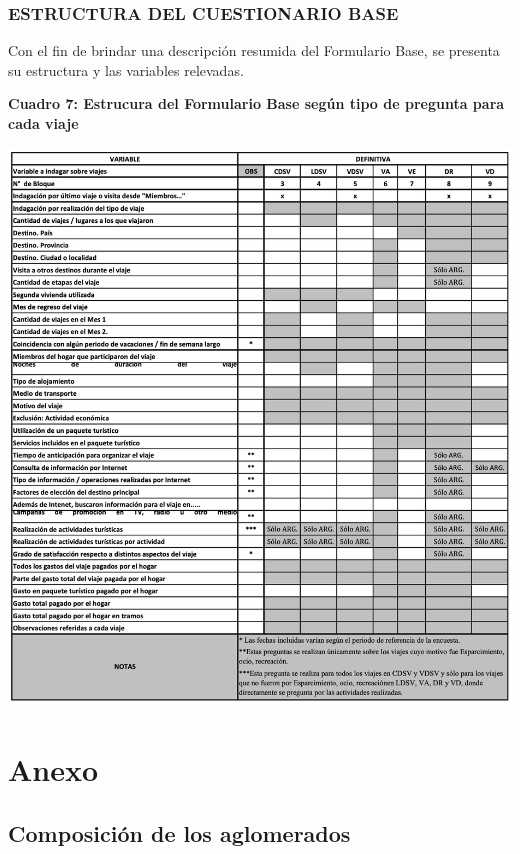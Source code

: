 \documentclass[
  openany]{book}
\begin{document}
\hypertarget{estructura-del-cuestionario-base}{%
\subsection{\texorpdfstring{\textbf{ESTRUCTURA DEL CUESTIONARIO BASE}}{ESTRUCTURA DEL CUESTIONARIO BASE}}\label{estructura-del-cuestionario-base}}

Con el fin de brindar una descripción resumida del Formulario Base, se presenta su estructura y las variables relevadas.

\textbf{Cuadro 7: Estrucura del Formulario Base según tipo de pregunta para cada viaje}

\includegraphics{cuadros_graficos/09_estructura_del_formulario.png}

\hypertarget{anexo}{%
\chapter{Anexo}\label{anexo}}

\hypertarget{composiciuxf3n-de-los-aglomerados}{%
\section{Composición de los aglomerados}\label{composiciuxf3n-de-los-aglomerados}}
\end{document}
